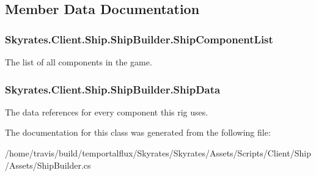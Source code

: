 \subsection{Member Data Documentation}
\hypertarget{class_skyrates_1_1_client_1_1_ship_1_1_ship_builder_a981d21bb8a64a205825b8d50813b897e}{
\subsubsection[{Ship\-Component\-List}]{ Skyrates.\-Client.\-Ship.\-Ship\-Builder.\-Ship\-Component\-List}}\label{class_skyrates_1_1_client_1_1_ship_1_1_ship_builder_a981d21bb8a64a205825b8d50813b897e}


The list of all components in the game. 

\hypertarget{class_skyrates_1_1_client_1_1_ship_1_1_ship_builder_a14ff4eece1ec5d9bab63c8449939305c}{
\subsubsection[{Ship\-Data}]{ Skyrates.\-Client.\-Ship.\-Ship\-Builder.\-Ship\-Data}}\label{class_skyrates_1_1_client_1_1_ship_1_1_ship_builder_a14ff4eece1ec5d9bab63c8449939305c}


The data references for every component this rig uses. 



The documentation for this class was generated from the following file\-:\begin{DoxyCompactItemize}
\item 
/home/travis/build/temportalflux/\-Skyrates/\-Skyrates/\-Assets/\-Scripts/\-Client/\-Ship/\-Assets/Ship\-Builder.\-cs\end{DoxyCompactItemize}
